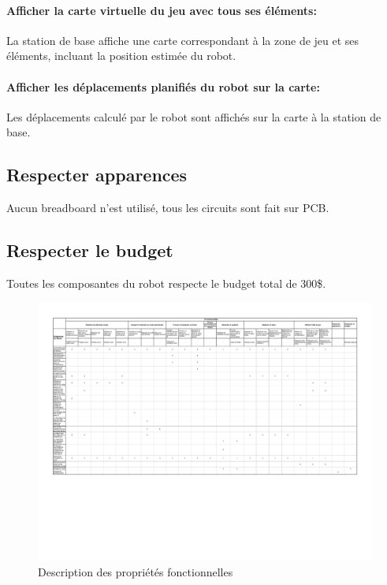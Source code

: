 \paragraph{Afficher la carte virtuelle du jeu avec tous ses éléments:}
La station de base affiche une carte correspondant à la zone de jeu et ses éléments, incluant la position estimée du robot.

\paragraph{Afficher les déplacements planifiés du robot sur la carte:}
Les déplacements calculé par le robot sont affichés sur la carte à la station de base.

\subsection{Respecter apparences}
Aucun breadboard n'est utilisé, tous les circuits sont fait sur PCB.

\subsection{Respecter le budget}
Toutes les composantes du robot respecte le budget total de 300\$.


\begin{landscape}
  \begin{center}
    \begin{figure}[h]
      \caption{Description des propriétés fonctionnelles}
      \label{fig:dpf}
      \centering
      \includegraphics[scale=0.85]{resources/dpf.pdf}
    \end{figure}
  \end{center}
\end{landscape}